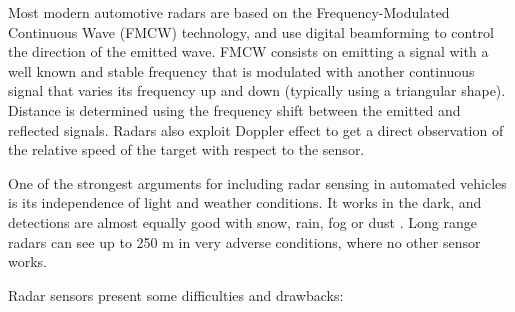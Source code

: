 Most modern automotive radars are based on the Frequency-Modulated Continuous
Wave (FMCW) technology, and use digital beamforming \cite{Hasch2015} to control
the direction of the emitted wave. 
FMCW consists on emitting a signal with a well known and stable frequency that
is modulated with another continuous signal that varies its frequency up and
down (typically using a triangular shape). Distance is
determined using the frequency shift between the emitted and reflected signals. 
Radars also exploit Doppler effect to get a direct observation of the relative
speed of the target with respect to the sensor. 



One of the strongest arguments for including radar sensing in automated 
vehicles is its independence of light and weather conditions. 
It works in the dark, and detections are almost equally good with snow, 
rain, fog or dust \cite{Reina2015}. Long range radars can see up to 250 m
in very adverse conditions, where no other sensor works.

Radar sensors present some difficulties and drawbacks:

